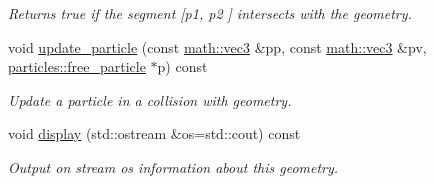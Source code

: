 \begin{DoxyCompactItemize}
\begin{DoxyCompactList}\small\item\em Returns true if the segment \mbox{[}{\itshape p1}, {\itshape p2} \mbox{]} intersects with the geometry. \end{DoxyCompactList}\item 
void \hyperlink{classphysim_1_1geom_1_1triangle_acb8405efe13b22987018916e5011c247}{update\+\_\+particle} (const \hyperlink{structphysim_1_1math_1_1vec3}{math\+::vec3} \&pp, const \hyperlink{structphysim_1_1math_1_1vec3}{math\+::vec3} \&pv, \hyperlink{classphysim_1_1particles_1_1free__particle}{particles\+::free\+\_\+particle} $\ast$p) const
\begin{DoxyCompactList}\small\item\em Update a particle in a collision with geometry. \end{DoxyCompactList}\item 
\mbox{\label{classphysim_1_1geom_1_1triangle_adce26c4a2e686d2468b887a2efcc0cd7}} 
void \hyperlink{classphysim_1_1geom_1_1triangle_adce26c4a2e686d2468b887a2efcc0cd7}{display} (std\+::ostream \&os=std\+::cout) const
\begin{DoxyCompactList}\small\item\em Output on stream {\itshape os} information about this geometry. \end{DoxyCompactList}\end{DoxyCompactItemize}
